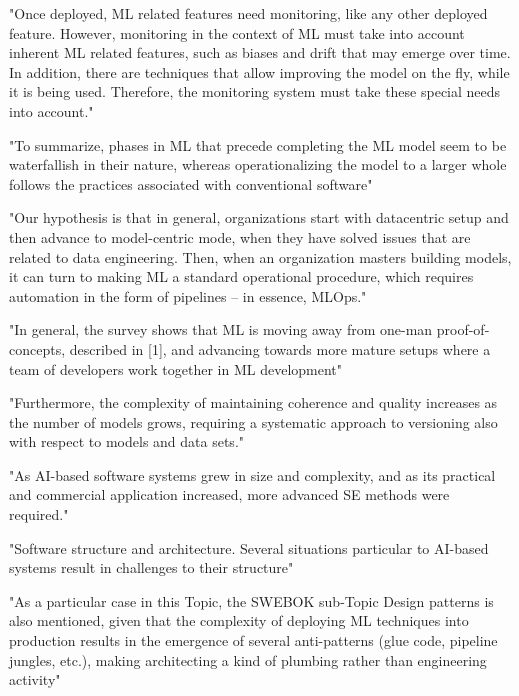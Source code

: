 "Once deployed, ML related features need monitoring, like any other deployed
feature. However, monitoring in the context of ML must take into account
inherent ML related features, such as biases and drift that may emerge over
time. In addition, there are techniques that allow improving the model on the
fly, while it is being used. Therefore, the monitoring system must take these
special needs into account."

"To summarize, phases in ML that precede completing the ML model seem to be
waterfallish in their nature, whereas operationalizing the model to a larger
whole follows the practices associated with conventional software"

"Our hypothesis is that in general, organizations start with datacentric setup
and then advance to model-centric mode, when they have solved issues that are
related to data engineering. Then, when an organization masters building models,
it can turn to making ML a standard operational procedure, which requires
automation in the form of pipelines – in essence, MLOps."

"In general, the survey shows that ML is moving away from one-man
proof-of-concepts, described in [1], and advancing towards more mature setups
where a team of developers work together in ML development"

"Furthermore, the complexity of maintaining coherence and
quality increases as the number of models grows, requiring a
systematic approach to versioning also with respect to models
and data sets."


\parencite{Martinez-Fernandez2022SoftwareSurvey}

"As AI-based software systems grew in size and complexity, and as its practical
and commercial application increased, more advanced SE methods were required."

"Software structure and architecture. Several situations particular to AI-based
systems result in challenges to their structure"

"As a particular case in this Topic, the SWEBOK sub-Topic Design patterns is
also mentioned, given that the complexity of deploying ML techniques into
production results in the emergence of several anti-patterns (glue code,
pipeline jungles, etc.), making architecting a kind of plumbing rather than
engineering activity"

